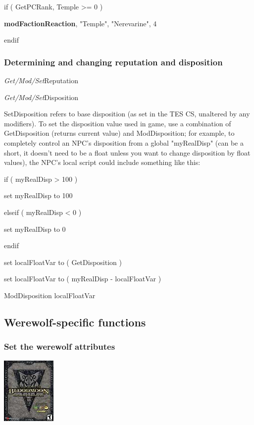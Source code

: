 \documentclass[
]{article}
\begin{document}
if ( GetPCRank, Temple \textgreater= 0 )

\textbf{modFactionReaction}, "Temple", "Nerevarine", 4

endif

\hypertarget{determining-and-changing-reputation-and-disposition}{%
\subsubsection{Determining and changing reputation and
disposition}\label{determining-and-changing-reputation-and-disposition}}

\emph{Get/Mod/Set}Reputation

\emph{Get/Mod/Set}Disposition

SetDisposition refers to base disposition (as set in the TES CS,
unaltered by any modifiers). To set the disposition value used in game,
use a combination of GetDisposition (returns current value) and
ModDisposition; for example, to completely control an NPC's disposition
from a global "myRealDisp" (can be a short, it doesn't need to be a
float unless you want to change disposition by float values), the NPC's
local script could include something like this:

if ( myRealDisp \textgreater{} 100 )

set myRealDisp to 100

elseif ( myRealDisp \textless{} 0 )

set myRealDisp to 0

endif

set localFloatVar to ( GetDisposition )

set localFloatVar to ( myRealDisp - localFloatVar )

ModDisposition localFloatVar

\emph{\hfill\break
}

\hypertarget{werewolf-specific-functions}{%
\subsection{Werewolf-specific
functions}\label{werewolf-specific-functions}}

\hypertarget{set-the-werewolf-attributes}{%
\subsubsection{Set the werewolf
attributes}\label{set-the-werewolf-attributes}}

\includegraphics{media/image7.png}
\end{document}
